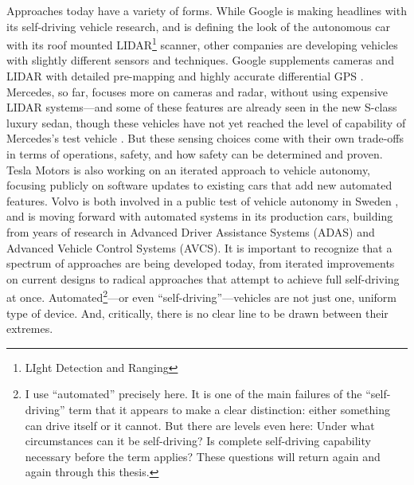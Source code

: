 Approaches today have a variety of forms. While Google is making
headlines with its self-driving vehicle research, and is defining the
look of the autonomous car with its roof mounted LIDAR\footnote{LIght
  Detection and Ranging} scanner, other
companies are developing vehicles with slightly different sensors and
techniques. Google supplements cameras and LIDAR with detailed pre-mapping and highly accurate
differential GPS \cite{guizzoHow}. Mercedes, so far, focuses more on
cameras and radar, 
without using expensive LIDAR systems---and some of these features are
already seen in the new S-class luxury sedan, though these vehicles
have not yet reached the level of capability of Mercedes's
test vehicle \cite{makingBertha}. But these sensing choices come with their own
trade-offs in terms of operations, safety, and how safety can be
determined and proven. Tesla Motors
is also working on an iterated 
approach to vehicle autonomy, focusing publicly on software updates to
existing cars that add new automated features. Volvo is both involved
in a public test of vehicle autonomy in Sweden \cite{volvoPR}, and is moving forward
with automated systems in its production cars, building from years of
research in Advanced Driver Assistance Systems (ADAS) and Advanced
Vehicle Control Systems (AVCS). It is important to recognize that
a spectrum of approaches are being developed today, from iterated
improvements on current designs to radical approaches that attempt to
achieve full self-driving at once. Automated\footnote{I use ``automated''
  precisely here. It is one of the main failures of the
  ``self-driving'' term that it appears to make a clear distinction: 
  either something can drive itself or it cannot. But there are
  levels even here: Under what circumstances can it be self-driving? Is
  complete self-driving capability necessary before the term applies?
  These questions will return again and again through this thesis. }---or even
``self-driving''---vehicles are not just one, uniform type of
device. And, critically, there is no clear
line to be drawn between their extremes.





